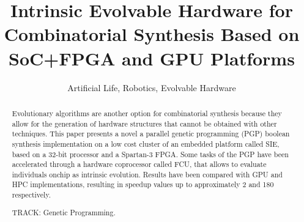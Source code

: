 \documentclass{sig-alternate}
\begin{document}



\title{Intrinsic Evolvable Hardware for Combinatorial Synthesis Based on SoC+FPGA and GPU Platforms}


\author{
\alignauthor Artificial Life, Robotics, Evolvable Hardware
}




\maketitle

\begin{abstract}
Evolutionary algorithms are another option for combinatorial synthesis because they allow for the generation of hardware structures that cannot be obtained with other techniques. This paper presents a novel a parallel genetic programming (PGP) boolean synthesis implementation on a low cost cluster of an embedded platform called SIE, based on a 32-bit processor and a Spartan-3 FPGA. Some tasks of the PGP have been accelerated through a hardware coprocessor called FCU, that allows to evaluate individuals onchip as intrinsic evolution. Results have been compared with GPU and HPC implementations, resulting in speedup values up to approximately 2 and 180 respectively.  

TRACK: Genetic Programming.
\end{abstract}
\end{document}
